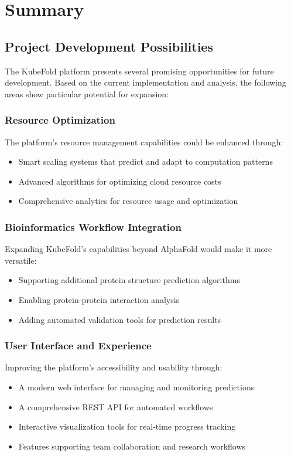 \chapter{Summary}

\section{Project Development Possibilities}

The KubeFold platform presents several promising opportunities for future development. Based on the current implementation and analysis, the following areas show particular potential for expansion:

\subsection{Resource Optimization}
The platform's resource management capabilities could be enhanced through:
\begin{itemize}
    \item Smart scaling systems that predict and adapt to computation patterns
    \item Advanced algorithms for optimizing cloud resource costs
    \item Comprehensive analytics for resource usage and optimization
\end{itemize}

\subsection{Bioinformatics Workflow Integration}
Expanding KubeFold's capabilities beyond AlphaFold would make it more versatile:
\begin{itemize}
    \item Supporting additional protein structure prediction algorithms
    \item Enabling protein-protein interaction analysis
    \item Adding automated validation tools for prediction results
\end{itemize}

\subsection{User Interface and Experience}
Improving the platform's accessibility and usability through:
\begin{itemize}
    \item A modern web interface for managing and monitoring predictions
    \item A comprehensive REST API for automated workflows
    \item Interactive visualization tools for real-time progress tracking
    \item Features supporting team collaboration and research workflows
\end{itemize}

